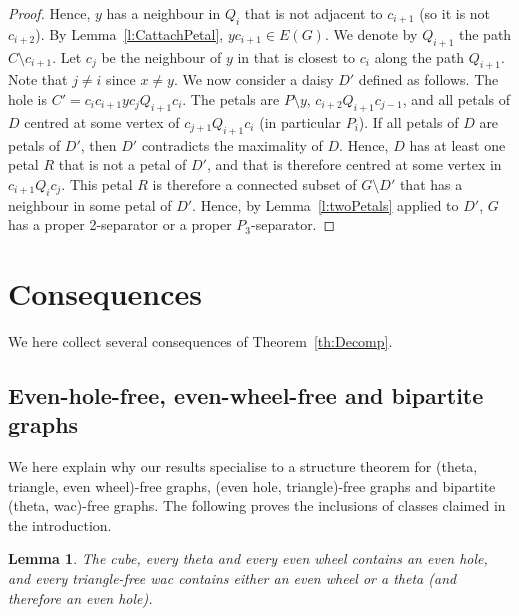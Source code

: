 \documentclass[11pt]{article}
\newtheorem{lemma}[theo]{Lemma}
\newcommand{\sm}{\setminus}
\begin{document}
\begin{proof}
Hence, $y$ has a neighbour in $Q_i$ that is not adjacent to $c_{i+1}$ (so it is not $c_{i+2}$). By Lemma~\ref{l:CattachPetal},
$yc_{i+1} \in E(G)$.  We denote by $Q_{i+1}$ the path $C\sm c_{i+1}$.
Let $c_{j}$ be the neighbour of $y$ in that is closest to $c_i$ along
the path $Q_{i+1}$. Note that $j \neq i$ since $x \neq y$.  We now
consider a daisy $D'$ defined as follows.  The hole is
$C' = c_i c_{i+1} y c_j Q_{i+1} c_i$.  The petals are $P\sm y$,
$c_{i+2} Q_{i+1} c_{j-1}$, and all petals of $D$ centred at some
vertex of $c_{j+1} Q_{i+1} c_i$ (in particular $P_i$).  If all petals
of $D$ are petals of $D'$, then $D'$ contradicts the maximality of
$D$.  Hence, $D$ has at least one petal $R$ that is not a petal of
$D'$, and that is therefore centred at some vertex in
$c_{i+1} Q_i c_j$.  This petal $R$ is therefore a connected
subset of $G\sm D'$ that has a neighbour in some petal of $D'$.  Hence,
by Lemma~\ref{l:twoPetals} applied to $D'$, $G$ has a proper
2-separator or a proper $P_3$-separator.
\end{proof}




\section{Consequences}
\label{sec:applications}


We here collect several consequences of Theorem~\ref{th:Decomp}. 


\subsection{Even-hole-free, even-wheel-free and bipartite graphs}
\label{ssec:ehf}

We here explain why our results specialise to a structure theorem for (theta, triangle, even wheel)-free graphs, (even hole, triangle)-free graphs and bipartite (theta, wac)-free graphs.  The following proves the inclusions of classes claimed in the introduction. 

\begin{lemma}
  \label{l:oddS}
  The cube, every theta and every even wheel contains an even hole, and every triangle-free wac contains either an even wheel or a theta (and therefore an even hole).
\end{lemma}
\end{document}

